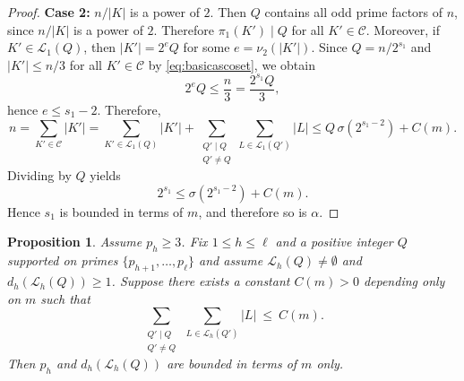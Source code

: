 \documentclass[11pt,reqno]{amsart}
\newtheorem{proposition}[theorem]{Proposition}
\theoremstyle{definition}
\newcommand{\Cset}{\mathcal{C}}
\newcommand{\Lset}{\mathcal{L}}
\begin{document}
\begin{proof}
\smallskip\noindent\textbf{Case 2: } \(n/|K|\) is a power of \(2\).
Then \(Q\) contains all odd prime factors of \(n\), since \(n/|K|\) is a power of \(2\).
Therefore \(\pi_1(K')\mid Q\) for all \(K'\in\Cset\).
Moreover, if \(K'\in \Lset_1(Q)\), then \(|K'|=2^eQ\) for some \(e=\nu_2(|K'|)\).
Since \(Q=n/2^{s_1}\) and \(|K'|\le n/3\) for all \(K'\in\Cset\) by \eqref{eq:basicascoset}, we obtain
\[
2^eQ \le \frac{n}{3}=\frac{2^{s_1}Q}{3},
\]
hence \(e\le s_1-2\).
Therefore,
\[
n = \sum_{K' \in \Cset} |K'|
= \sum_{K' \in \Lset_1(Q)} |K'|
+ \sum_{\substack{Q'\mid Q\\ Q'\neq Q}} \sum_{L\in\Lset_1(Q')} |L|
\le Q\,\sigma\!\left(2^{s_1-2}\right)+C(m).
\]
Dividing by \(Q\) yields
\[
2^{s_1}\le \sigma\!\left(2^{s_1-2}\right)+C(m).
\]
Hence \(s_1\) is bounded in terms of \(m\), and therefore so is \(\alpha\).
\end{proof}

\begin{proposition}
\label{prop:bound-vh_odd}
Assume \(p_h\ge 3\).
Fix \(1\le h\le \ell\) and a positive integer \(Q\) supported on primes \(\{p_{h+1},\dots,p_\ell\}\) and assume \(\Lset_h(Q)\neq\emptyset\) and \(d_h(\Lset_h(Q))\ge 1\). Suppose there exists a constant \(C(m)>0\) depending only on \(m\) such that
\[ \sum_{\substack{Q'\mid Q\\ Q'\neq Q}}\ \sum_{L\in\Lset_h(Q')} |L|\ \le\ C(m). \]
Then \(p_h\) and \(d_h(\Lset_h(Q))\) are bounded in terms of \(m\) only.
\end{proposition}
\end{document}
